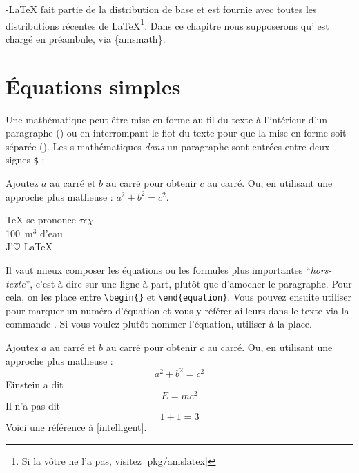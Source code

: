 \AmS-\LaTeX{} fait partie de la distribution de base et est fournie
avec toutes les distributions récentes de \LaTeX{}\footnote{Si la
  vôtre ne l'a pas, visitez
  \CTAN|pkg/amslatex|}. Dans ce chapitre nous
  supposerons qu' est chargé en préambule, via
  {\{amsmath\}}.

\section{Équations simples}

Une  mathématique peut être mise en forme
au fil du texte à l'intérieur d'un paragraphe
(\emph{}) ou en interrompant le flot du texte pour
que la mise en forme soit séparée (\textit{}). Les
s mathématiques \emph{dans} un paragraphe sont entrées
entre deux signes \index{$\iffalse$\fi @\texttt{\$}} \texttt{\$} :
\begin{example}
Ajoutez $a$ au carré 
et $b$ au carré pour obtenir
$c$ au carré. Ou, en 
utilisant une approche plus
matheuse : $a^2 + b^2 = c^2$.
\end{example}
\begin{example}
 \TeX{} se prononce 
$\tau\epsilon\chi$\\[5pt]
100~m$^{3}$ d'eau\\[5pt]
J'$\heartsuit$ \LaTeX{}
\end{example}

Il vaut mieux composer les équations ou les formules plus importantes
\enquote{\emph{hors-texte}}, c'est-à-dire sur une ligne à part, plutôt que
d'amocher le paragraphe.  Pour cela, on les
place entre \verb|\begin{|\verb|}| et
\verb|\end{equation}|.
Vous pouvez ensuite utiliser  pour marquer un numéro
d'équation et vous y référer ailleurs dans le texte via la commande
. Si vous voulez plutôt nommer l'équation, utiliser 
à la place.

\begin{example}
Ajoutez $a$ au carré 
et $b$ au carré pour obtenir
$c$ au carré. Ou, en 
utilisant une approche plus
matheuse :
 \begin{equation}
   a^2 + b^2 = c^2
 \end{equation}
Einstein a dit
 \begin{equation}
   E = mc^2 \label{intelligent}
 \end{equation}
Il n'a pas dit
 \begin{equation}
  1 + 1 = 3 \tag{idiot}
 \end{equation}
Voici une référence à
\eqref{intelligent}.
\end{example}

